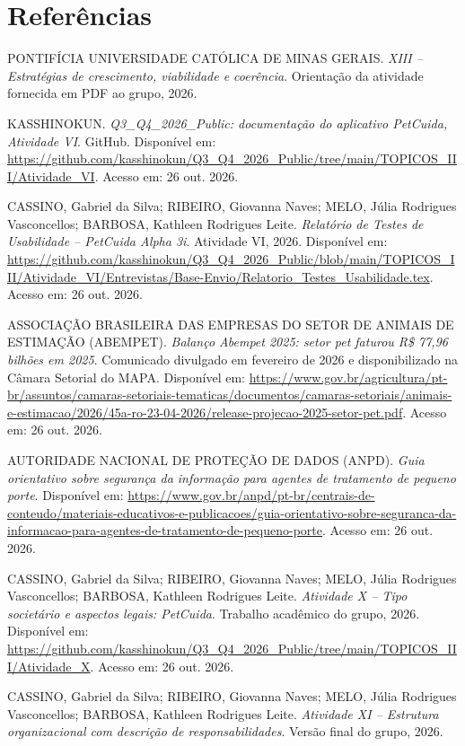\documentclass[12pt,a4paper]{article}
\begin{document}
\section*{Referências}
\small
\begin{enumerate}[label={[\arabic*]},leftmargin=1.3cm,itemsep=0.2em]
\item PONTIFÍCIA UNIVERSIDADE CATÓLICA DE MINAS GERAIS. \textit{XIII -- Estratégias de crescimento, viabilidade e coerência}. Orientação da atividade fornecida em PDF ao grupo, 2026.
\item KASSHINOKUN. \textit{Q3\_Q4\_2026\_Public: documentação do aplicativo PetCuida, Atividade VI}. GitHub. Disponível em: \url{https://github.com/kasshinokun/Q3_Q4_2026_Public/tree/main/TOPICOS_III/Atividade_VI}. Acesso em: 26 out. 2026.
\item CASSINO, Gabriel da Silva; RIBEIRO, Giovanna Naves; MELO, Júlia Rodrigues Vasconcellos; BARBOSA, Kathleen Rodrigues Leite. \textit{Relatório de Testes de Usabilidade -- PetCuida Alpha 3i}. Atividade VI, 2026. Disponível em: \url{https://github.com/kasshinokun/Q3_Q4_2026_Public/blob/main/TOPICOS_III/Atividade_VI/Entrevistas/Base-Envio/Relatorio_Testes_Usabilidade.tex}. Acesso em: 26 out. 2026.
\item ASSOCIAÇÃO BRASILEIRA DAS EMPRESAS DO SETOR DE ANIMAIS DE ESTIMAÇÃO (ABEMPET). \textit{Balanço Abempet 2025: setor pet faturou R\$ 77,96 bilhões em 2025}. Comunicado divulgado em fevereiro de 2026 e disponibilizado na Câmara Setorial do MAPA. Disponível em: \url{https://www.gov.br/agricultura/pt-br/assuntos/camaras-setoriais-tematicas/documentos/camaras-setoriais/animais-e-estimacao/2026/45a-ro-23-04-2026/release-projecao-2025-setor-pet.pdf}. Acesso em: 26 out. 2026.
\item AUTORIDADE NACIONAL DE PROTEÇÃO DE DADOS (ANPD). \textit{Guia orientativo sobre segurança da informação para agentes de tratamento de pequeno porte}. Disponível em: \url{https://www.gov.br/anpd/pt-br/centrais-de-conteudo/materiais-educativos-e-publicacoes/guia-orientativo-sobre-seguranca-da-informacao-para-agentes-de-tratamento-de-pequeno-porte}. Acesso em: 26 out. 2026.
\item CASSINO, Gabriel da Silva; RIBEIRO, Giovanna Naves; MELO, Júlia Rodrigues Vasconcellos; BARBOSA, Kathleen Rodrigues Leite. \textit{Atividade X -- Tipo societário e aspectos legais: PetCuida}. Trabalho acadêmico do grupo, 2026. Disponível em: \url{https://github.com/kasshinokun/Q3_Q4_2026_Public/tree/main/TOPICOS_III/Atividade_X}. Acesso em: 26 out. 2026.
\item CASSINO, Gabriel da Silva; RIBEIRO, Giovanna Naves; MELO, Júlia Rodrigues Vasconcellos; BARBOSA, Kathleen Rodrigues Leite. \textit{Atividade XI -- Estrutura organizacional com descrição de responsabilidades}. Versão final do grupo, 2026.
\end{enumerate}
\normalsize
\end{document}
